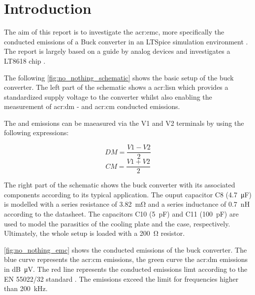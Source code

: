 \chapter{Introduction}
\label{chapter:introduction}

The aim of this report is to investigate the \gls{acr:emc}, more specifically the conducted emissions of a Buck converter in an LTSpice simulation environment \autocite{LTspiceInformationCenter}. The report is largely based on a guide by analog devices \autocite{HowGetBest} and investigates a LT8618 chip \autocite{LT8618DatasheetProduct}.

The following \autoref{fig:no_nothing_schematic} shows the basic setup of the buck converter. The left part of the schematic shows a \gls{acr:lisn} which provides a standardized supply voltage to the converter whilst also enabling the measurement of \gls{acr:dm} - and \gls{acr:cm} conducted emissions.

The  and  emissions can be maeasured via the V1 and V2 terminals by using the following expressions:

\begin{equation}
    DM = \frac{V1 - V2}{2}
\end{equation}
\begin{equation}
    CM = \frac{V1 + V2}{2}
\end{equation} 

The right part of the schematic shows the buck converter with its associated components according to its typical application. The ouput capacitor C8 (\qty{4.7}{\micro\farad}) is modelled with a series resistance of \qty{3.82}{\milli\ohm} and a series inductance of \qty{0.7}{\nano\henry} according to the datasheet.
The capacitors C10 (\qty{5}{\pico\farad}) and C11 (\qty{100}{\pico\farad}) are used to model the parasitics of the cooling plate and the case, respectively. Ultimately, the whole setup is loaded with a \qty{200}{\ohm} resistor.

\autoref{fig:no_nothing_emc} shows the conducted emissions of the buck converter. The blue curve represents the \gls{acr:cm} emissions, the green curve the \gls{acr:dm} emissions in \unit{dB\micro\volt}. The red line represents the conducted emissions limt according to the EN 55022/32 standard \autocite{hegartyReviewEMIStandards2018}.
The emissions exceed the limit for frequencies higher than \qty{200}{\kilo\hertz}.

